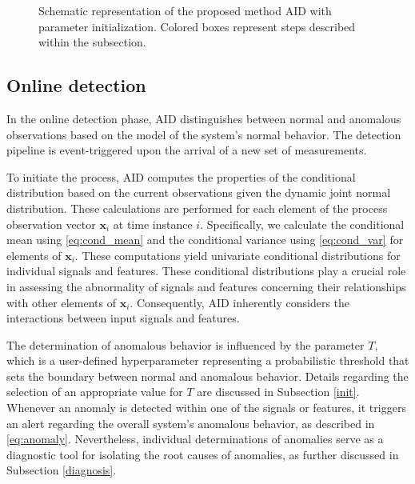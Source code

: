 \begin{figure}[htbp]
  \centering
  \caption{Schematic representation of the proposed method AID with parameter initialization. Colored boxes represent steps described within the subsection.}
  \label{fig:method}
\end{figure}

\subsection{Online detection}\label{detect}
In the online detection phase, AID distinguishes between normal and anomalous observations based on the model of the system's normal behavior. The detection pipeline is event-triggered upon the arrival of a new set of measurements.

To initiate the process, AID computes the properties of the conditional distribution based on the current observations given the dynamic joint normal distribution. These calculations are performed for each element of the process observation vector $\boldsymbol{x}_i$ at time instance $i$. Specifically, we calculate the conditional mean using \eqref{eq:cond_mean} and the conditional variance using \eqref{eq:cond_var} for elements of $\boldsymbol{x}_i$. These computations yield univariate conditional distributions for individual signals and features. These conditional distributions play a crucial role in assessing the abnormality of signals and features concerning their relationships with other elements of $\boldsymbol{x}_i$. Consequently, AID inherently considers the interactions between input signals and features.

The determination of anomalous behavior is influenced by the parameter $T$, which is a user-defined hyperparameter representing a probabilistic threshold that sets the boundary between normal and anomalous behavior. Details regarding the selection of an appropriate value for $T$ are discussed in Subsection \ref{init}. Whenever an anomaly is detected within one of the signals or features, it triggers an alert regarding the overall system's anomalous behavior, as described in \eqref{eq:anomaly}. Nevertheless, individual determinations of anomalies serve as a diagnostic tool for isolating the root causes of anomalies, as further discussed in Subsection \ref{diagnosis}.

